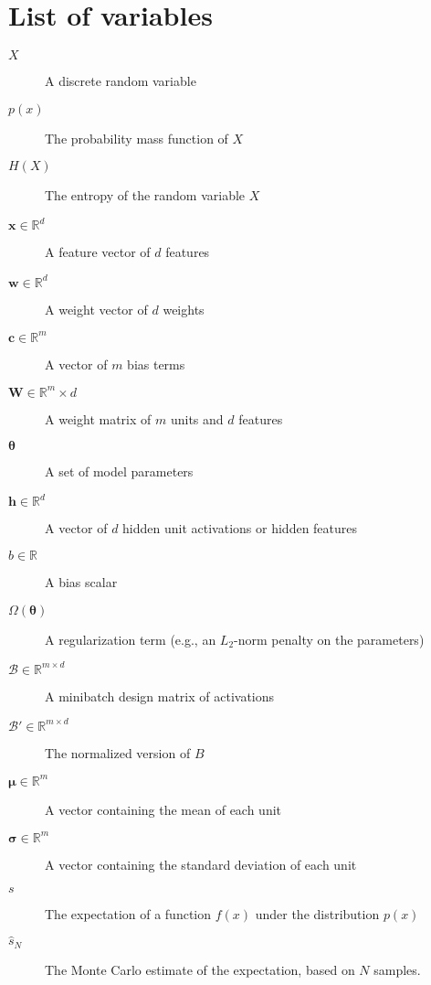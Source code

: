 \chapter*{List of variables}

\begin{description}
    \item[$X$] A discrete random variable
    \item[$p(x)$] The probability mass function of $X$
    \item[$H(X)$] The entropy of the random variable $X$
    \item[$\mathbf{x} \in \mathbb{R}^d$] A feature vector of $d$ features
    \item[$\mathbf{w} \in \mathbb{R}^d$] A weight vector of $d$ weights
    \item[$\mathbf{c} \in \mathbb{R}^m$] A vector of $m$ bias terms
    \item[$\mathbf{W} \in \mathbb{R}^m\times d$] A weight matrix of $m$ units and $d$ features
    \item[$\boldsymbol{\theta}$] A set of model parameters
    \item[$\mathbf{h} \in \mathbb{R}^d$] A vector of $d$ hidden unit activations or hidden features
    \item[$b \in \mathbb{R}$] A bias scalar 
    \item[$\Omega(\boldsymbol{\theta})$] A regularization term (e.g., an $L_2$-norm penalty on the parameters)
    \item[$\mathcal{B} \in \mathbb{R}^{m\times d}$] A minibatch design matrix of activations
    \item[$\mathcal{B}' \in \mathbb{R}^{m\times d}$] The normalized version of $B$
    \item[$\boldsymbol{\mu} \in \mathbb{R}^m$] A vector containing the mean of each unit
    \item[$\boldsymbol{\sigma} \in \mathbb{R}^m$] A vector containing the standard deviation of each unit
    
    \item[$s$] The expectation of a function $f(x)$ under the distribution $p(x)$
    \item[$\hat{s}_N$] The Monte Carlo estimate of the expectation, based on $N$ samples.
  \end{description}